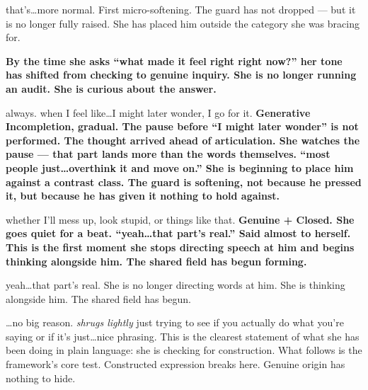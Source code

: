 {that's\ldots more normal.}
{First micro-softening. The guard has not dropped --- but it is no longer 
fully raised. She has placed him outside the category she was bracing for.}

\thinrule

{\textbf{By the time she asks ``what made it feel right right now?'' her tone 
has shifted from checking to genuine inquiry. She is no longer running an audit. 
She is curious about the answer.}}

{always. when I feel like\ldots I might later wonder, I go for it.}
{\textbf{Generative Incompletion, gradual. The pause before ``I might later 
wonder'' is not performed. The thought arrived ahead of articulation. She watches 
the pause --- that part lands more than the words themselves. ``most people 
just\ldots overthink it and move on.'' She is beginning to place him against a 
contrast class. The guard is softening, not because he pressed it, but because 
he has given it nothing to hold against.}}

\thinrule

{whether I'll mess up, look stupid, or things like that.}
{\textbf{Genuine + Closed. She goes quiet for a beat. ``yeah\ldots that part's 
real.'' Said almost to herself. This is the first moment she stops directing 
speech at him and begins thinking alongside him. The shared field has begun 
forming.}}

{yeah\ldots that part's real.}
{She is no longer directing words at him. She is thinking alongside him. 
The shared field has begun.}

\thinrule

{\ldots no big reason. \textit{shrugs lightly} just trying to see if you 
actually do what you're saying or if it's just\ldots nice phrasing.}
{This is the clearest statement of what she has been doing in plain language: 
she is checking for construction. What follows is the framework's core test. 
Constructed expression breaks here. Genuine origin has nothing to hide.}

